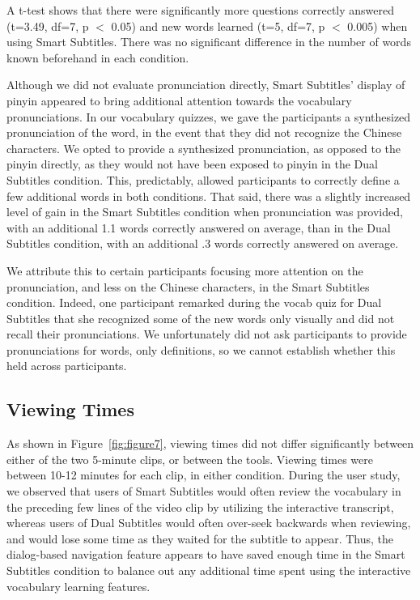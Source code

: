 \documentclass{sigchi}
\begin{document}
A t-test shows that there were significantly more questions correctly answered (t=3.49, df=7, p $<$ 0.05) and new words learned (t=5, df=7, p $<$ 0.005) when using Smart Subtitles.
There was no significant difference in the number of words known beforehand in each condition.


Although we did not evaluate pronunciation directly, Smart Subtitles' display of pinyin appeared to bring additional attention towards the vocabulary pronunciations. In our vocabulary quizzes, we gave the participants a synthesized pronunciation of the word, in the event that they did not recognize the Chinese characters. We opted to provide a synthesized pronunciation, as opposed to the pinyin directly, as they would not have been exposed to pinyin in the Dual Subtitles condition. This, predictably, allowed participants to correctly define a few additional words in both conditions. That said, there was a slightly increased level of gain in the Smart Subtitles condition when pronunciation was provided, with an additional 1.1 words correctly answered on average, than in the Dual Subtitles condition, with an additional .3 words correctly answered on average.

We attribute this to certain participants focusing more attention on the pronunciation, and less on the Chinese characters, in the Smart Subtitles condition. Indeed, one participant remarked during the vocab quiz for Dual Subtitles that she recognized some of the new words only visually and did not recall their pronunciations. We unfortunately did not ask participants to provide pronunciations for words, only definitions, so we cannot establish whether this held across participants.

\subsection{Viewing Times}

As shown in Figure~\ref{fig:figure7}, viewing times did not differ significantly between either of the two 5-minute clips, or between the tools. Viewing times were between 10-12 minutes for each clip, in either condition.
During the user study, we observed that users of Smart Subtitles would often review the vocabulary in the preceding few lines of the video clip by utilizing the interactive transcript, whereas users of Dual Subtitles would often over-seek backwards when reviewing, and would lose some time as they waited for the subtitle to appear.
Thus, the dialog-based navigation feature appears to have saved enough time in the Smart Subtitles condition to balance out any additional time spent using the interactive vocabulary learning features.
\end{document}

